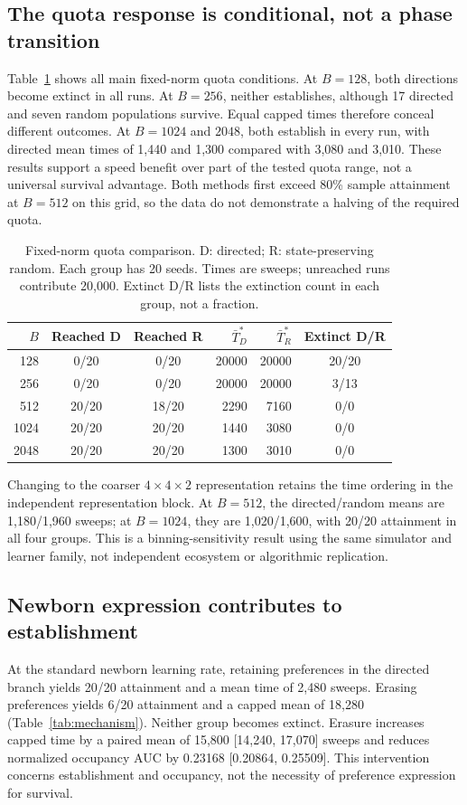 \documentclass[11pt]{article}
\begin{document}
\subsection{The quota response is conditional, not a phase transition}
Table~\ref{tab:fixed} shows all main fixed-norm quota conditions. At $B=128$, both directions become extinct in all runs. At $B=256$, neither establishes, although 17 directed and seven random populations survive. Equal capped times therefore conceal different outcomes. At $B=1024$ and $2048$, both establish in every run, with directed mean times of 1,440 and 1,300 compared with 3,080 and 3,010. These results support a speed benefit over part of the tested quota range, not a universal survival advantage. Both methods first exceed 80\% sample attainment at $B=512$ on this grid, so the data do not demonstrate a halving of the required quota.

\begin{table}[htbp]\caption{Fixed-norm quota comparison. D: directed; R: state-preserving random. Each group has 20 seeds. Times are sweeps; unreached runs contribute 20,000. Extinct D/R lists the extinction count in each group, not a fraction.}\label{tab:fixed}
\begin{center}
\small
\begin{tabular}{rccrrc}
\toprule
$B$ & Reached D & Reached R & $\bar T_D^*$ & $\bar T_R^*$ & Extinct D/R \\
\midrule
128 & 0/20 & 0/20 & 20000 & 20000 & 20/20 \\
256 & 0/20 & 0/20 & 20000 & 20000 & 3/13 \\
512 & 20/20 & 18/20 & 2290 & 7160 & 0/0 \\
1024 & 20/20 & 20/20 & 1440 & 3080 & 0/0 \\
2048 & 20/20 & 20/20 & 1300 & 3010 & 0/0 \\
\bottomrule
\end{tabular}
\end{center}
\end{table}

Changing to the coarser $4\times4\times2$ representation retains the time ordering in the independent representation block. At $B=512$, the directed/random means are 1,180/1,960 sweeps; at $B=1024$, they are 1,020/1,600, with 20/20 attainment in all four groups. This is a binning-sensitivity result using the same simulator and learner family, not independent ecosystem or algorithmic replication.

\subsection{Newborn expression contributes to establishment}
At the standard newborn learning rate, retaining preferences in the directed branch yields 20/20 attainment and a mean time of 2,480 sweeps. Erasing preferences yields 6/20 attainment and a capped mean of 18,280 (Table~\ref{tab:mechanism}). Neither group becomes extinct. Erasure increases capped time by a paired mean of 15,800 [14,240, 17,070] sweeps and reduces normalized occupancy AUC by 0.23168 [0.20864, 0.25509]. This intervention concerns establishment and occupancy, not the necessity of preference expression for survival.
\end{document}
